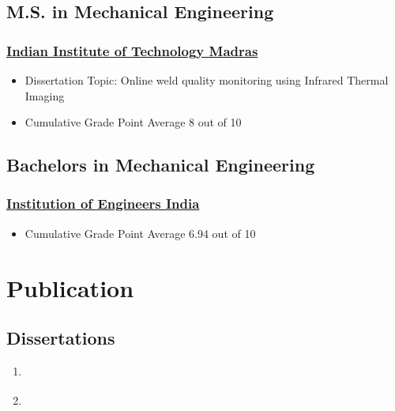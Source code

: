 \documentclass{my_cv}%
\begin{document}
\subsection{M.S. in Mechanical Engineering}
\subsubsection{\faInstitution \hspace{0.2em} \href{https://www.iitm.ac.in/}{Indian Institute of Technology Madras}}
\begin{itemize}[leftmargin=0.15in]
\setlength\itemsep{-0.1em}
\color{mygray}
\item Dissertation Topic: Online weld quality monitoring using Infrared Thermal Imaging
\item Cumulative Grade Point Average 8 out of 10
\end{itemize}
{\color{mygray1} \hdashrule[0.1ex]{18.8cm}{0.2mm}{1mm}}
\subsection{Bachelors in Mechanical Engineering}
\subsubsection{\faInstitution \hspace{0.2em} \href{https://www.ieindia.org/webui/iei-home.aspx}{Institution of Engineers India}}
\begin{itemize}[leftmargin=0.15in]
\setlength\itemsep{-0.1em}
\color{mygray}
\item Cumulative Grade Point Average 6.94 out of 10
\end{itemize}
\section{Publication}
\vspace{1em}
%

\subsection{\faBook \hspace{0.2em} \bfseries Dissertations}
\vspace{1em}
\begin{enumerate}
\setlength\itemsep{-0.1em}
\color{mygray}
 \item {} \cite{sreedhar2014}
 \item {} \cite{sreedhar2011}
\end{enumerate}
\end{document}
